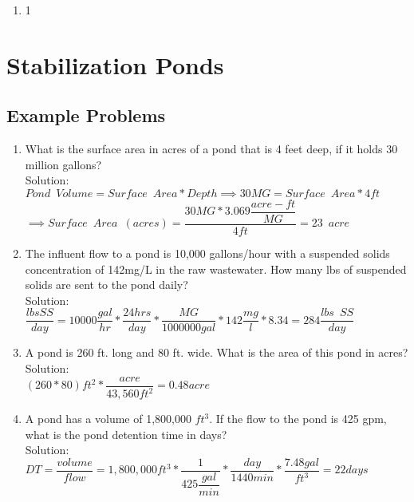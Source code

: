 \documentclass{article}
\begin{document}
\begin{enumerate}


\item 1


\end{enumerate}

\section{Stabilization Ponds}

\subsection{Example Problems} 

\begin{enumerate}

\item What is the surface area in acres of a pond that is 4 feet deep, if it holds 30 million gallons?\\

Solution:\\
$Pond \enspace Volume= Surface \enspace Area*Depth \implies 30MG=Surface \enspace Area*4ft$\\
$ \implies Surface \enspace Area \enspace (acres)=\dfrac{30MG*3.069\dfrac{acre-ft}{MG}}{4ft}=\boxed{23 \enspace acre}$


\item The influent flow to a pond is 10,000 gallons/hour with a suspended solids concentration of 142mg/L in the raw wastewater.  How many lbs of suspended solids are sent to the pond daily?
\\
Solution:\\
$\dfrac{lbs SS}{day}=10000\dfrac{gal}{hr}*\dfrac{24hrs}{day}*\dfrac{MG}{1000000gal}*142\dfrac{mg}{l}*8.34=\boxed{284\dfrac{lbs \enspace SS}{day}}$


\item A pond is 260 ft. long and 80 ft. wide. What is the area of this pond in acres?\\ 
Solution:\\
$(260*80)ft^2*\dfrac{acre}{43,560ft^2}=\boxed{0.48acre}$

\item A pond has a volume of 1,800,000 $ft^3$. If the flow to the pond is 425 gpm, what is the pond detention time in days?
\\
Solution:\\
$DT=\dfrac{volume}{flow}=1,800,000ft^3*\dfrac{1}{425\dfrac{gal}{min}}*\dfrac{day}{1440min}*\dfrac{7.48gal}{ft^3}=\boxed{22days}$


\end{enumerate}
\end{document}

